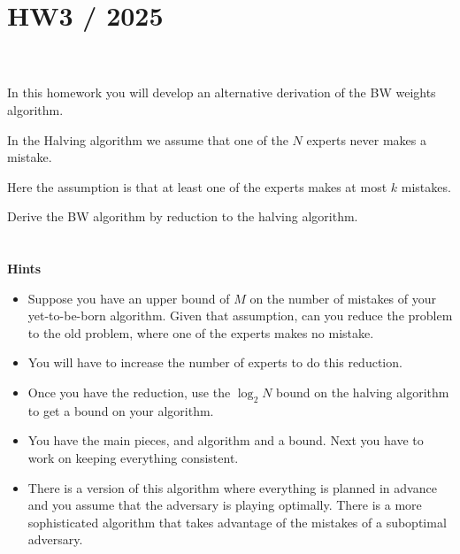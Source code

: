 \documentclass[12pt]{article}
\begin{document}
 
 
\section{HW3 / 2025}

~\\~\\
In this homework you will develop an alternative derivation of the BW weights algorithm.

In the Halving algorithm we assume that one of the $N$ experts never makes
a mistake.

Here the assumption is that at least one of the experts makes at most
$k$ mistakes.

Derive the BW algorithm by reduction to the halving algorithm.
~\\
~\\
~\\
{\bf Hints}
\begin{itemize}
  \item Suppose you have an upper bound of $M$ on the number of
    mistakes of your yet-to-be-born algorithm. Given that assumption,
    can you reduce the problem to the old problem, where one of the
    experts makes no mistake.
  \item You will have to increase the number of experts to do this reduction.
  \item Once you have the reduction, use the $\log_2 N$ bound on the
    halving algorithm to get a bound on your algorithm.
  \item You have the main pieces, and algorithm and  a bound. Next you
    have to work on keeping everything consistent.
  \item There is a version of this algorithm where everything is
    planned in advance and you assume that the adversary is playing
    optimally. There is a more sophisticated algorithm that takes
    advantage of the mistakes of a suboptimal adversary.
\end{itemize}
\end{document}
